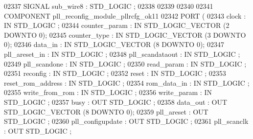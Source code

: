 \begin{DoxyCode}
{02337     \textcolor{keywordflow}{SIGNAL} \textcolor{vhdlchar}{sub_wire8}    \textcolor{vhdlchar}{:} \textcolor{comment}{STD\_LOGIC} ;
02338 
02339 
02340 
02341     \textcolor{keywordflow}{COMPONENT} pll_reconfig_module_pllrcfg_ok11
02342     \textcolor{keywordflow}{PORT} (
02343             clock   : \textcolor{keywordflow}{IN} \textcolor{comment}{STD\_LOGIC} ;
02344             counter_param   : \textcolor{keywordflow}{IN} \textcolor{comment}{STD\_LOGIC\_VECTOR} (\textcolor{vhdllogic}{}\textcolor{vhdllogic}{2} \textcolor{keywordflow}{DOWNTO} \textcolor{vhdllogic}{}\textcolor{vhdllogic}{0});
02345             counter_type    : \textcolor{keywordflow}{IN} \textcolor{comment}{STD\_LOGIC\_VECTOR} (\textcolor{vhdllogic}{}\textcolor{vhdllogic}{3} \textcolor{keywordflow}{DOWNTO} \textcolor{vhdllogic}{}\textcolor{vhdllogic}{0});
02346             data_in : \textcolor{keywordflow}{IN} \textcolor{comment}{STD\_LOGIC\_VECTOR} (\textcolor{vhdllogic}{}\textcolor{vhdllogic}{8} \textcolor{keywordflow}{DOWNTO} \textcolor{vhdllogic}{}\textcolor{vhdllogic}{0});
02347             pll_areset_in   : \textcolor{keywordflow}{IN} \textcolor{comment}{STD\_LOGIC} ;
02348             pll_scandataout : \textcolor{keywordflow}{IN} \textcolor{comment}{STD\_LOGIC} ;
02349             pll_scandone    : \textcolor{keywordflow}{IN} \textcolor{comment}{STD\_LOGIC} ;
02350             read_param  : \textcolor{keywordflow}{IN} \textcolor{comment}{STD\_LOGIC} ;
02351             reconfig    : \textcolor{keywordflow}{IN} \textcolor{comment}{STD\_LOGIC} ;
02352             reset   : \textcolor{keywordflow}{IN} \textcolor{comment}{STD\_LOGIC} ;
02353             reset_rom_address   : \textcolor{keywordflow}{IN} \textcolor{comment}{STD\_LOGIC} ;
02354             rom_data_in : \textcolor{keywordflow}{IN} \textcolor{comment}{STD\_LOGIC} ;
02355             write_from_rom  : \textcolor{keywordflow}{IN} \textcolor{comment}{STD\_LOGIC} ;
02356             write_param : \textcolor{keywordflow}{IN} \textcolor{comment}{STD\_LOGIC} ;
02357             busy    : \textcolor{keywordflow}{OUT} \textcolor{comment}{STD\_LOGIC} ;
02358             data_out    : \textcolor{keywordflow}{OUT} \textcolor{comment}{STD\_LOGIC\_VECTOR} (\textcolor{vhdllogic}{}\textcolor{vhdllogic}{8} \textcolor{keywordflow}{DOWNTO} \textcolor{vhdllogic}{}\textcolor{vhdllogic}{0});
02359             pll_areset  : \textcolor{keywordflow}{OUT} \textcolor{comment}{STD\_LOGIC} ;
02360             pll_configupdate    : \textcolor{keywordflow}{OUT} \textcolor{comment}{STD\_LOGIC} ;
02361             pll_scanclk : \textcolor{keywordflow}{OUT} \textcolor{comment}{STD\_LOGIC} ;
}
\end{DoxyCode}
